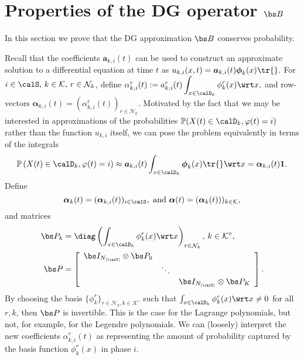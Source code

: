\section{Properties of the DG operator \(\bs B\)}\label{sec:properties}
In this section we prove that the DG approximation \(\bs B\) conserves probability. 

Recall that the coefficients \({\boldsymbol a}_{k,i}(t)\) can be used to construct an approximate solution to a differential equation at time \(t\) as \(u_{k,i}(x,t)={\boldsymbol a}_{k,i}(t)\boldsymbol \phi_k(x)\tr{}.\) For \(i\in\calS,\,k\in\mathcal K,\,r\in\mathcal N_k\), define \(\alpha_{k,i}^r(t) := a_{k,i}^r(t)\displaystyle\int_{x\in\calD_k}\phi^r_k(x)\wrt x,\) and row-vectors \(\boldsymbol \alpha_{k,i}(t)=(\alpha_{k,i}^r(t))_{r\in\mathcal N_k}\). Motivated by the fact that we may be interested in approximations of the probabilities \(\mathbb P(X(t)\in\calD_k,\varphi(t)=i)\) rather than the function \(u_{k,i}\) itself, we can pose the problem equivalently in terms of the integrals 
\[\mathbb P\left(X(t)\in\calD_k,\varphi(t)=i\right)\approx{\boldsymbol a}_{k,i}(t)\int_{x\in\calD_k}\boldsymbol \phi_k(x)\tr{}\wrt x={\boldsymbol \alpha}_{k,i}(t)\boldsymbol 1.\] 
Define
\[\boldsymbol \alpha_k(t) = (\boldsymbol \alpha_{k,i}(t))_{i\in\calS},\mbox{ and } \boldsymbol \alpha(t)=(\boldsymbol \alpha_k(t)))_{k\in\mathcal K},\]
and matrices 
\begin{align*}
\bs P_k &= \diag\left(\int_{x\in\calD_k}\phi^r_k(x)\wrt x\right)_{ r\in\mathcal N_k},\, k\in\mathcal K^\circ,
\\\bs P &=\left[\begin{array}{ccc}
		\bs I_{N_{|\calS|}}\otimes \bs P_0 & &\\
		& \ddots &\\
		& & \bs I_{N_{|\calS|}}\otimes \bs P_K
	\end{array}\right].
\end{align*}
By choosing the basis \(\{\phi_{k}^r\}_{r\in\mathcal N_k,k\in\mathcal K^\circ}\) such that \(\int_{x\in\calD_k}\phi^r_k(x)\wrt x\neq 0\) for all \(r,k\), then \(\bs P\) is invertible. This is the case for the Lagrange polynomials, but not, for example, for the Legendre polynomials. We can (loosely) interpret the new coefficients \(\alpha_{k,i}^r(t)\) as representing the amount of probability captured by the basis function \(\phi^r_k(x)\) in phase \(i\).

